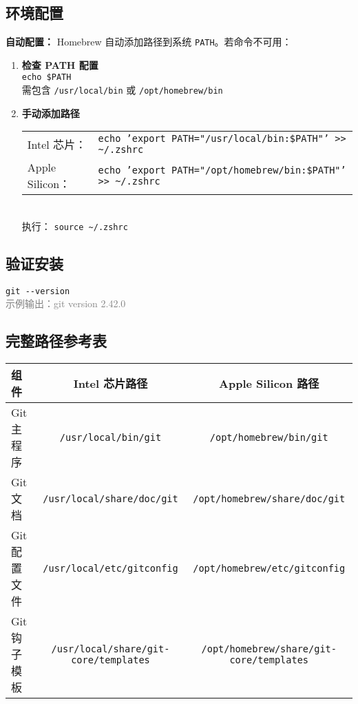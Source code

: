 \subsection{环境配置}
\textbf{自动配置：}  
Homebrew 自动添加路径到系统 \texttt{PATH}。若命令不可用：
\begin{enumerate}[leftmargin=*, nosep]
    \item \textbf{检查 PATH 配置} \\ 
    \texttt{echo \$PATH} \\ 
    需包含 \texttt{/usr/local/bin} 或 \texttt{/opt/homebrew/bin}
    
    \item \textbf{手动添加路径} \\
    \begin{tabular}{@{}ll@{}}
        Intel 芯片： & \texttt{echo 'export PATH="/usr/local/bin:\$PATH"' >> \textasciitilde/.zshrc} \\
        Apple Silicon： & \texttt{echo 'export PATH="/opt/homebrew/bin:\$PATH"' >> \textasciitilde/.zshrc}
    \end{tabular}
 \\
    执行： \texttt{source \textasciitilde/.zshrc}
\end{enumerate}

\subsection{验证安装}
\begin{center}
    \texttt{git {-}{-}version} \\ 
    \textcolor{gray}{示例输出：git version 2.42.0}
\end{center}

\subsection{完整路径参考表}
\begin{center}
\begin{tabular}{lcc}
    \toprule
    \textbf{组件} & \textbf{Intel 芯片路径} & \textbf{Apple Silicon 路径} \\
    \midrule
    Git 主程序 & \texttt{/usr/local/bin/git} & \texttt{/opt/homebrew/bin/git} \\
    Git 文档 & \texttt{/usr/local/share/doc/git} & \texttt{/opt/homebrew/share/doc/git} \\
    Git 配置文件 & \texttt{/usr/local/etc/gitconfig} & \texttt{/opt/homebrew/etc/gitconfig} \\
    Git 钩子模板 & \texttt{/usr/local/share/git-core/templates} & \texttt{/opt/homebrew/share/git-core/templates} \\
    \bottomrule
\end{tabular}
\end{center}

